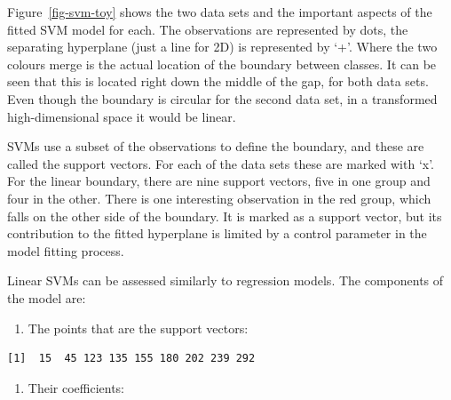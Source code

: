 \documentclass[
  letterpaper,
]{book}
\newenvironment{Shaded}{\begin{snugshade}}{\end{snugshade}}
\newcommand{\NormalTok}[1]{\textcolor[rgb]{0.00,0.23,0.31}{#1}}
\newcommand{\SpecialCharTok}[1]{\textcolor[rgb]{0.37,0.37,0.37}{#1}}
\providecommand{\tightlist}{%
  \setlength{\itemsep}{0pt}\setlength{\parskip}{0pt}}\usepackage{longtable,booktabs,array}
\begin{document}
Figure~\ref{fig-svm-toy} shows the two data sets and the important
aspects of the fitted SVM model for each. The observations are
represented by dots, the separating hyperplane (just a line for 2D) is
represented by `+'. Where the two colours merge is the actual location
of the boundary between classes. It can be seen that this is located
right down the middle of the gap, for both data sets. Even though the
boundary is circular for the second data set, in a transformed
high-dimensional space it would be linear.

SVMs use a subset of the observations to define the boundary, and these
are called the support vectors. For each of the data sets these are
marked with `x'. For the linear boundary, there are nine support
vectors, five in one group and four in the other. There is one
interesting observation in the red group, which falls on the other side
of the boundary. It is marked as a support vector, but its contribution
to the fitted hyperplane is limited by a control parameter in the model
fitting process.

Linear SVMs can be assessed similarly to regression models. The
components of the model are:

\begin{enumerate}
\def\labelenumi{\arabic{enumi}.}
\tightlist
\item
  The points that are the support vectors:
\end{enumerate}

\begin{Shaded}
\end{Shaded}

\begin{verbatim}
[1]  15  45 123 135 155 180 202 239 292
\end{verbatim}

\begin{enumerate}
\def\labelenumi{\arabic{enumi}.}
\setcounter{enumi}{1}
\tightlist
\item
  Their coefficients:
\end{enumerate}

\begin{Shaded}
\end{Shaded}
\end{document}
